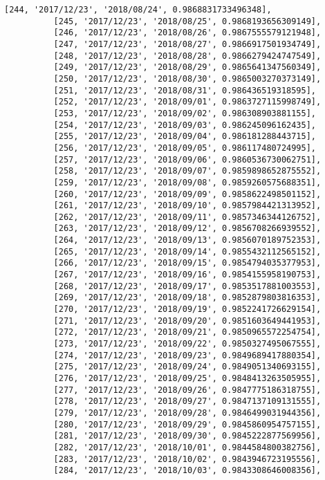 \documentclass[11pt]{article}
\begin{document}
\begin{Verbatim}[commandchars=\\\{\}]
          [244, '2017/12/23', '2018/08/24', 0.9868831733496348],
          [245, '2017/12/23', '2018/08/25', 0.9868193656309149],
          [246, '2017/12/23', '2018/08/26', 0.9867555579121948],
          [247, '2017/12/23', '2018/08/27', 0.9866917501934749],
          [248, '2017/12/23', '2018/08/28', 0.9866279424747549],
          [249, '2017/12/23', '2018/08/29', 0.9865641347560349],
          [250, '2017/12/23', '2018/08/30', 0.9865003270373149],
          [251, '2017/12/23', '2018/08/31', 0.986436519318595],
          [252, '2017/12/23', '2018/09/01', 0.9863727115998749],
          [253, '2017/12/23', '2018/09/02', 0.986308903881155],
          [254, '2017/12/23', '2018/09/03', 0.986245096162435],
          [255, '2017/12/23', '2018/09/04', 0.986181288443715],
          [256, '2017/12/23', '2018/09/05', 0.986117480724995],
          [257, '2017/12/23', '2018/09/06', 0.9860536730062751],
          [258, '2017/12/23', '2018/09/07', 0.9859898652875552],
          [259, '2017/12/23', '2018/09/08', 0.9859260575688351],
          [260, '2017/12/23', '2018/09/09', 0.9858622498501152],
          [261, '2017/12/23', '2018/09/10', 0.9857984421313952],
          [262, '2017/12/23', '2018/09/11', 0.9857346344126752],
          [263, '2017/12/23', '2018/09/12', 0.9856708266939552],
          [264, '2017/12/23', '2018/09/13', 0.9856070189752353],
          [265, '2017/12/23', '2018/09/14', 0.9855432112565152],
          [266, '2017/12/23', '2018/09/15', 0.9854794035377953],
          [267, '2017/12/23', '2018/09/16', 0.9854155958190753],
          [268, '2017/12/23', '2018/09/17', 0.9853517881003553],
          [269, '2017/12/23', '2018/09/18', 0.9852879803816353],
          [270, '2017/12/23', '2018/09/19', 0.9852241726629154],
          [271, '2017/12/23', '2018/09/20', 0.9851603649441953],
          [272, '2017/12/23', '2018/09/21', 0.9850965572254754],
          [273, '2017/12/23', '2018/09/22', 0.9850327495067555],
          [274, '2017/12/23', '2018/09/23', 0.9849689417880354],
          [275, '2017/12/23', '2018/09/24', 0.9849051340693155],
          [276, '2017/12/23', '2018/09/25', 0.9848413263505955],
          [277, '2017/12/23', '2018/09/26', 0.9847775186318755],
          [278, '2017/12/23', '2018/09/27', 0.9847137109131555],
          [279, '2017/12/23', '2018/09/28', 0.9846499031944356],
          [280, '2017/12/23', '2018/09/29', 0.9845860954757155],
          [281, '2017/12/23', '2018/09/30', 0.9845222877569956],
          [282, '2017/12/23', '2018/10/01', 0.9844584800382756],
          [283, '2017/12/23', '2018/10/02', 0.9843946723195556],
          [284, '2017/12/23', '2018/10/03', 0.9843308646008356],

\end{Verbatim}
\end{document}
